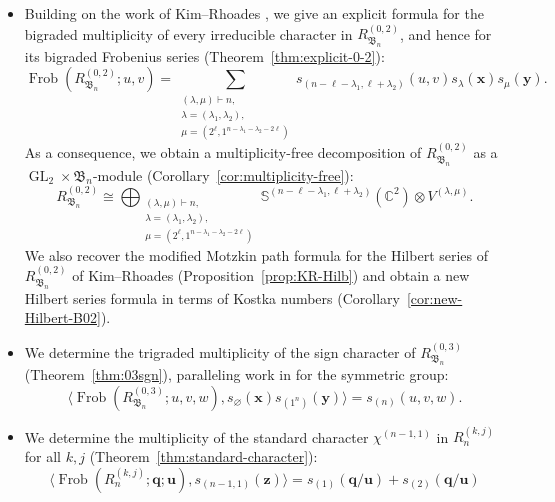 \documentclass[12pt]{amsart}
\theoremstyle{plain}
\theoremstyle{definition}
\DeclareMathOperator{\Frob}{Frob}
\DeclareMathOperator{\GL}{GL}
\newcommand{\C}{\mathbb{C}}
\newcommand{\x}{\mathbf{x}}
\newcommand{\y}{\mathbf{y}}
\newcommand{\z}{\mathbf{z}}
\begin{document}
\begin{itemize}
    \item Building on the work of Kim--Rhoades \cite{MR4381935}, we give an explicit formula for the bigraded multiplicity of every irreducible character in $R_{\mathfrak{B}_n}^{(0,2)}$, and hence for its bigraded Frobenius series (Theorem~\ref{thm:explicit-0-2}):
    \begin{equation}
    \Frob(R_{\mathfrak{B}_n}^{(0,2)};u,v) = \sum_{\substack{(\lambda, \mu)\vdash n,\\ \lambda = (\lambda_1,\lambda_2),\\ \mu = (2^\ell, 1^{n-\lambda_1-\lambda_2-2\ell}) }} s_{(n-\ell-\lambda_1, \ell+\lambda_2)}(u,v)s_{\lambda}(\x) s_{\mu}(\y).
    \end{equation}
    As a consequence, we obtain a multiplicity-free decomposition of $R_{\mathfrak{B}_n}^{(0,2)}$ as a $\GL_2 \times \mathfrak{B}_n$-module (Corollary~\ref{cor:multiplicity-free}):
    \begin{equation}
        R_{\mathfrak{B}_n}^{(0,2)} \cong \bigoplus_{\substack{(\lambda, \mu) \vdash n,\\
        \lambda = (\lambda_1,\lambda_2),\\
        \mu = (2^\ell, 1^{n-\lambda_1-\lambda_2 - 2\ell})}}
        \mathbb{S}^{(n-\ell-\lambda_1, \ell+\lambda_2)}(\C^2) \otimes V^{(\lambda, \mu)}.
    \end{equation}
    We also recover the modified Motzkin path formula for the Hilbert series of $R_{\mathfrak{B}_n}^{(0,2)}$ of Kim--Rhoades (Proposition~\ref{prop:KR-Hilb}) and obtain a new Hilbert series formula in terms of Kostka numbers (Corollary~\ref{cor:new-Hilbert-B02}).
    \item We determine the trigraded multiplicity of the sign character of $R_{\mathfrak{B}_n}^{(0,3)}$ (Theorem~\ref{thm:03sgn}), paralleling work in \cite{lentfer2026signcharactertriagonalfermionic} for the symmetric group:
    \begin{equation}
        \langle \Frob(R_{\mathfrak{B}_n}^{(0,3)};u,v,w),s_{\varnothing}(\x) s_{(1^n)}(\y) \rangle =s_{(n)}(u,v,w).
    \end{equation}
    \item We determine the multiplicity of the standard character $\chi^{(n-1,1)}$ in $R_n^{(k,j)}$ for all $k,j$ (Theorem~\ref{thm:standard-character}):
    \begin{equation}
        \langle \Frob(R_n^{(k,j)}; \mathbf{q};\mathbf{u}),
        s_{(n-1,1)}(\z) \rangle
        = s_{(1)}(\mathbf{q}/\mathbf{u}) + s_{(2)}(\mathbf{q}/\mathbf{u})

\end{equation}
\end{itemize}
\end{document}
